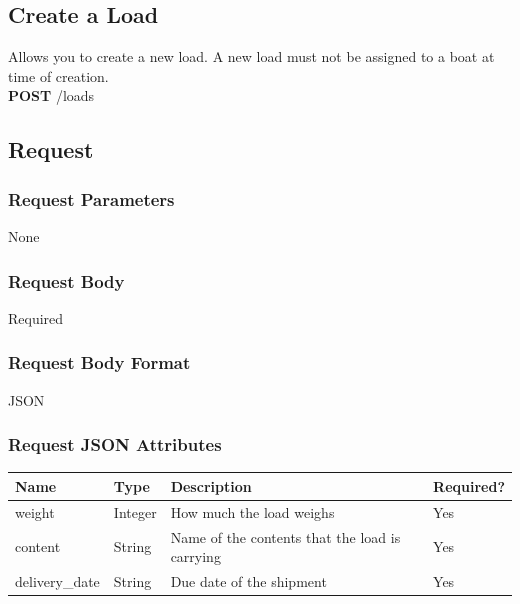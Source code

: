 \documentclass[letterpaper,11pt,titlepage,draftclsnofoot,onecolumn,compsoc,utf8,latin1]{IEEEtran}
\begin{document}
\begin{singlespace}
\newpage

\normalsize

\section{Create a Load}

Allows you to create a new load. A new load must not be assigned to a boat at time of creation.\\

\noindent \textbf{POST} /loads

\subsection{Request}

\subsubsection{Request Parameters}

None

\subsubsection{Request Body}

Required

\subsubsection{Request Body Format}

JSON

\subsubsection{Request JSON Attributes}

\begin{center}
\begin{tabular}{ |p{}|p{}|p{}|p{}| } 
 \hline
 \textbf{Name} & \textbf{Type} & \textbf{Description} & \textbf{Required?} \\  \hline
 weight & Integer & How much the load weighs & Yes  \\ \hline
 content & String & Name of the contents that the load is carrying & Yes \\ \hline 
 delivery\_date & String & Due date of the shipment & Yes \\
 \hline
\end{tabular}
\end{center}


\end{singlespace}
\end{document}
